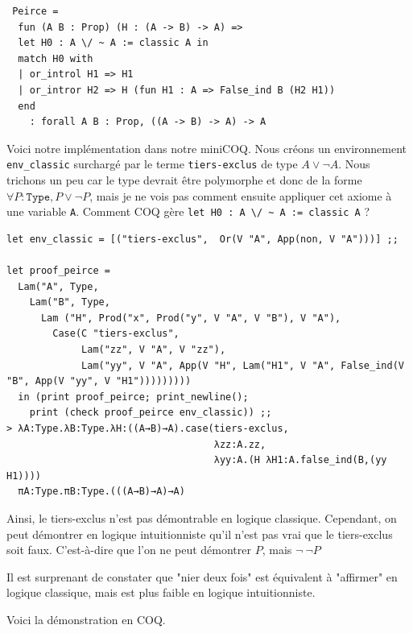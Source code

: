 \documentclass[11pt]{book}
\begin{document}
\begin{Verbatim}
 Peirce = 
  fun (A B : Prop) (H : (A -> B) -> A) =>
  let H0 : A \/ ~ A := classic A in
  match H0 with
  | or_introl H1 => H1
  | or_intror H2 => H (fun H1 : A => False_ind B (H2 H1))
  end
    : forall A B : Prop, ((A -> B) -> A) -> A
\end{Verbatim}

Voici notre implémentation dans notre miniCOQ. 
Nous créons un environnement \verb+env_classic+ surchargé par le terme \verb+tiers-exclus+ de type $A \vee \neg A$.
Nous trichons un peu car le type devrait être polymorphe et donc de la forme $\forall P:\mathtt{Type}, P \vee \neg P$, mais 
je ne vois pas comment ensuite appliquer cet axiome à une variable \verb+A+. Comment COQ gère \verb+let H0 : A \/ ~ A := classic A+ ? 

\begin{Verbatim}
let env_classic = [("tiers-exclus",  Or(V "A", App(non, V "A")))] ;;

let proof_peirce = 
  Lam("A", Type,
    Lam("B", Type, 
      Lam ("H", Prod("x", Prod("y", V "A", V "B"), V "A"),
        Case(C "tiers-exclus",
             Lam("zz", V "A", V "zz"),
             Lam("yy", V "A", App(V "H", Lam("H1", V "A", False_ind(V "B", App(V "yy", V "H1")))))))))
  in (print proof_peirce; print_newline();
    print (check proof_peirce env_classic)) ;;
> λA:Type.λB:Type.λH:((A→B)→A).case(tiers-exclus,
                                    λzz:A.zz,
                                    λyy:A.(H λH1:A.false_ind(B,(yy H1))))
  πA:Type.πB:Type.(((A→B)→A)→A)
\end{Verbatim}

Ainsi, le tiers-exclus n'est pas démontrable en logique classique. Cependant, on peut
démontrer en logique intuitionniste qu'il n'est pas vrai que le tiers-exclus soit faux.
C'est-à-dire que l'on ne peut démontrer $P$, mais $\lnot\ \lnot P$

Il est surprenant de constater que "nier deux fois" est équivalent à "affirmer" en logique classique, mais est plus
faible en logique intuitionniste.

Voici la démonstration en COQ.
\end{document}

